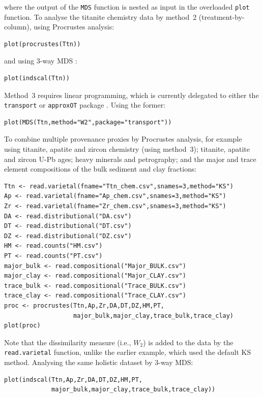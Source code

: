 \documentclass{article}
\begin{document}
\noindent where the output of the \texttt{MDS} function is nested as
input in the overloaded \texttt{plot} function. To analyse the
titanite chemistry data by method~2 (treatment-by-column), using
Procrustes analysis:
\begin{verbatim}
plot(procrustes(Ttn))
\end{verbatim}

\noindent and using 3-way MDS \cite[a.k.a. `Individual Differences
  Scaling' or INDSCAL]{carroll1970}:
\begin{verbatim}
plot(indscal(Ttn))
\end{verbatim}

Method~3 requires linear programming, which is currently delegated to
either the \texttt{transport} or \texttt{approxOT} package
\cite{schumacher2022, dunipace2021}. Using the former:
\begin{verbatim}
plot(MDS(Ttn,method="W2",package="transport"))
\end{verbatim}

To combine multiple provenance proxies by Procrustes analysis, for
example using titanite, apatite and zircon chemistry (using method~3);
titanite, apatite and zircon U-Pb ages; heavy minerals and
petrography; and the major and trace element compositions of the bulk
sediment and clay fractions:
\begin{verbatim}
Ttn <- read.varietal(fname="Ttn_chem.csv",snames=3,method="KS")
Ap <- read.varietal(fname="Ap_chem.csv",snames=3,method="KS")
Zr <- read.varietal(fname="Zr_chem.csv",snames=3,method="KS")
DA <- read.distributional("DA.csv")
DT <- read.distributional("DT.csv")
DZ <- read.distributional("DZ.csv")
HM <- read.counts("HM.csv")
PT <- read.counts("PT.csv")
major_bulk <- read.compositional("Major_BULK.csv")
major_clay <- read.compositional("Major_CLAY.csv")
trace_bulk <- read.compositional("Trace_BULK.csv")
trace_clay <- read.compositional("Trace_CLAY.csv")
proc <- procrustes(Ttn,Ap,Zr,DA,DT,DZ,HM,PT,
                   major_bulk,major_clay,trace_bulk,trace_clay)
plot(proc)
\end{verbatim}

Note that the dissimilarity measure (i.e., $W_2$) is added to the data
by the \texttt{read.varietal} function, unlike the earlier example,
which used the default KS method. Analysing the same holistic dataset
by 3-way MDS:
\begin{verbatim}
plot(indscal(Ttn,Ap,Zr,DA,DT,DZ,HM,PT,
             major_bulk,major_clay,trace_bulk,trace_clay))
\end{verbatim}
\end{document}
